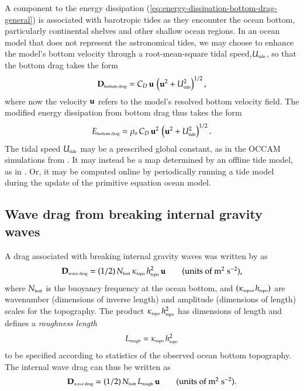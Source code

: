 A component to the energy dissipation
(\ref{eq:energy-dissipation-bottom-drag-general}) is associated with
barotropic tides as they encounter the ocean bottom, particularly
continental shelves and other shallow ocean regions.  In an ocean
model that does not represent the astronomical tides, we may choose to
enhance the model's bottom velocity through a root-mean-square tidal
speed,$U_{\mbox{\tiny tide}}$, so that the bottom drag takes the form
\begin{equation}
  {\bf D}_{\mbox{\tiny bottom drag}} = 
  C_{D} \, {\bf u} \, \left( {\bf u}^{2} + U_{\mbox{\tiny tide}}^{2} \right)^{1/2},
\end{equation}
where now the velocity ${\bf u}$ refers to the model's resolved bottom
velocity field.  The modified energy dissipation from bottom drag
thus takes the form
\begin{equation}
 E_{\mbox{\tiny bottom drag}} =  \rho_{o} \, C_{D} \,  {\bf u}^{2} \, \left( {\bf u}^{2} + U_{\mbox{\tiny tide}}^{2} \right)^{1/2}.
\label{eq:energy-dissipation-bottom-drag-with-tides}
\end{equation}
The tidal speed $U_{\mbox{\tiny tide}}$ may be a prescribed global
constant, as in the OCCAM simulations from \cite{Webbetal1998}.  It
may instead be a map determined by an offline tide model, as in
\cite{Jayne_etal2001}.  Or, it may be computed online by periodically
running a tide model during the update of the primitive equation ocean
model.


\subsection{Wave drag from breaking internal gravity waves}

A drag associated with breaking internal gravity waves was written by
\cite{Jayne_etal2001} as
\begin{equation}
  {\bf D}_{\mbox{\tiny wave drag}} = (1/2) \, N_{\mbox{\tiny bott}}\,  
  \kappa_{\mbox{\tiny topo}} \, h_{\mbox{\tiny topo}}^{2} \, {\bf u}
\qquad \mbox{(units of $\mbox{m}^{2} \; \mbox{s}^{-2}$),}
\end{equation}
where $N_{\mbox{\tiny bott}}$ is the buoyancy frequency at the ocean
bottom, and $(\kappa_{\mbox{\tiny topo}},h_{\mbox{\tiny topo}})$ are
wavenumber (dimensions of inverse length) and amplitude (dimensions of
length) scales for the topography.  The product $\kappa_{\mbox{\tiny
    topo}} \, h_{\mbox{\tiny topo}}^{2}$ has dimensions of length and
defines a {\em roughness length}
\begin{equation}
  L_{\mbox{\tiny rough}} = \kappa_{\mbox{\tiny topo}} \, h_{\mbox{\tiny topo}}^{2}  
\label{eq:roughness-length}
\end{equation}
to be specified according to statistics of the observed ocean bottom
topography.  The internal wave drag can thus be written as
\begin{equation}
  {\bf D}_{\mbox{\tiny wave drag}} = (1/2) \, N_{\mbox{\tiny bott}}  \,  L_{\mbox{\tiny rough}} \, {\bf u}
\qquad \mbox{(units of $\mbox{m}^{2} \; \mbox{s}^{-2}$).}
\end{equation}


